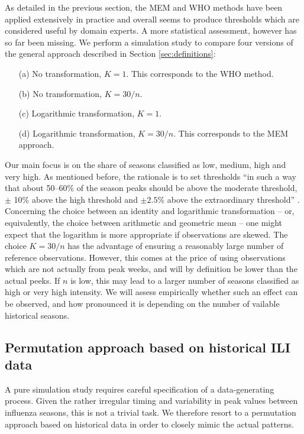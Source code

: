 \documentclass{article}
\begin{document}
As detailed in the previous section, the MEM and WHO methods have been applied extensively in practice and overall seems to produce thresholds which are considered useful by domain experts. A more statistical assessment, however has so far been missing. We perform a simulation study to compare four versions of the general approach described in Section \ref{sec:definitions}:
\begin{enumerate}
\item[(a)] No transformation, $K = 1$. This corresponds to the WHO method.
\item[(b)] No transformation, $K = 30/n$.
\item[(c)] Logarithmic transformation, $K = 1$.
\item[(d)] Logarithmic transformation, $K = 30/n$. This corresponds to the MEM approach.
\end{enumerate}

Our main focus is on the share of seasons classified as low, medium, high and very high. As mentioned before, the rationale is to set thresholds ``in such a way that about 50--60\% of the season peaks should be above the moderate threshold, $\pm$ 10\% above the high threshold and $\pm 2.5\%$ above the extraordinary threshold'' \citep{WHO2017}. Concerning the choice between an identity and logarithmic transformation -- or, equivalently, the choice between arithmetic and geometric mean -- one might expect that the logarithm is more appropriate if observations are skewed. The choice $K = 30/n$ has the advantage of ensuring a reasonably large number of reference observations. However, this comes at the price of using observations which are not actually from peak weeks, and will by definition be lower than the actual peeks. If $n$ is low, this may lead to a larger number of seasons classified as high or very high intensity. We will assess empirically whether such an effect can be observed, and how pronounced it is depending on the number of vailable historical seasons.

\subsection{Permutation approach based on historical ILI data}

A pure simulation study requires careful specification of a data-generating process. Given the rather irregular timing and variability in peak values between influenza seasons, this is not a trivial task. We therefore resort to a permutation approach based on historical data in order to closely mimic the actual patterns.
\end{document}
